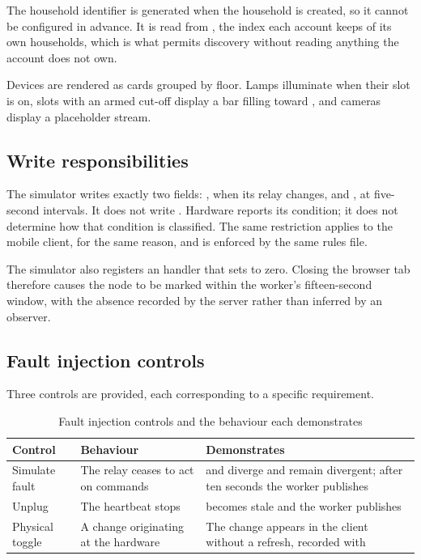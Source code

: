\documentclass[11pt,a4paper]{article}
\begin{document}
The household identifier is generated when the household is created, so it
cannot be configured in advance. It is read from ,
the index each account keeps of its own households, which is what permits
discovery without reading anything the account does not own.

Devices are rendered as cards grouped by floor. Lamps illuminate when their slot
is on, slots with an armed cut-off display a bar filling toward
, and cameras display a placeholder stream.

\subsection{Write responsibilities}

The simulator writes exactly two fields: , when its relay
changes, and , at five-second intervals. It does not write
. Hardware reports its condition; it does not determine how that
condition is classified. The same restriction applies to the mobile client, for
the same reason, and is enforced by the same rules file.

The simulator also registers an  handler that sets
 to zero. Closing the browser tab therefore causes the node to be
marked  within the worker's fifteen-second window, with the
absence recorded by the server rather than inferred by an observer.

\subsection{Fault injection controls}

Three controls are provided, each corresponding to a specific requirement.

\begin{table}[h]
\centering
\caption{Fault injection controls and the behaviour each demonstrates}
\label{tab:chaos}
\begin{tabular}{@{}L{2.9cm}L{4.4cm}L{6.8cm}@{}}
\toprule
\textbf{Control} & \textbf{Behaviour} & \textbf{Demonstrates} \\
\midrule
Simulate fault & The relay ceases to act on commands &
   and  diverge and remain divergent;
  after ten seconds the worker publishes  \\
Unplug & The heartbeat stops &
   becomes stale and the worker publishes  \\
Physical toggle & A change originating at the hardware &
  The change appears in the client without a refresh, recorded with
   \\
\bottomrule
\end{tabular}
\end{table}
\end{document}
